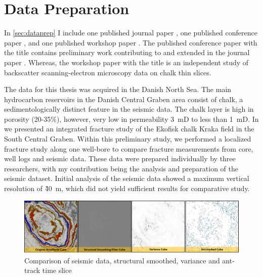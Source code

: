 \section{Data Preparation}

In \cref{sec:dataprep} I include one published journal paper \citep{aabo2018integrated}, one published conference paper \citep{aabo2017correlation}, and one published workshop paper \citep{dramsch2018gaussian}. The published conference paper with the title  contains preliminary work contributing to and extended in the journal paper . Whereas, the workshop paper with the title  is an independent study of backscatter scanning-electron microscopy data on chalk thin slices.

The data for this thesis was acquired in the Danish North Sea. The main hydrocarbon reservoirs in the Danish Central Graben area consist of chalk, a sedimentologically distinct feature in the seismic data. The chalk layer is high in porosity (20-35\%), however, very low in permeability 3~mD to less than 1~mD. In \citet{aabo2017correlation} we presented an integrated fracture study of the Ekofisk chalk Kraka field in the South Central Graben. Within this preliminary study, we performed a localized fracture study along one well-bore to compare fracture measurements from core, well logs and seismic data. These data were prepared individually by three researchers, with my contribution being the analysis and preparation of the seismic dataset. Initial analysis of the seismic data showed a maximum vertical resolution of \~40~m, which did not yield sufficient results for comparative study. 

\begin{figure}[!ht]
    \centering
    \includegraphics[width=\textwidth]{figures/seismic-comparisons.png}
    \caption{Comparison of seismic data, structural smoothed, variance and ant-track time slice}
    \label{fig:seismic-comparison}
\end{figure}

